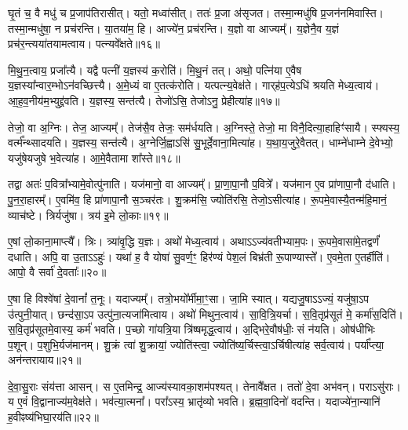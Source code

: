 घृ॒तं च॒ वै मधु॑ च प्र॒जा\-प॑तिरासीत्।
यतो॒ मध्वा॑सीत्।
ततः॑ प्र॒जा अ॑\-सृजत।
तस्मा॒न्मधु॑षि प्र॒जन॑नमिवास्ति।
तस्मा॒न्मधु॑षा॒ न प्रच॑रन्ति।
या॒तया॑म॒ हि।
आज्ये॑न॒ प्रच॑रन्ति।
य॒ज्ञो वा आज्यम्᳚।
य॒ज्ञेनै॒व य॒ज्ञं प्रच॑र॒न्त्यया॑तयामत्वाय।
पत्न्यवे᳚क्षते॥१६॥\ip

मि॒थु॒न॒त्वाय॒ प्रजा᳚त्यै।
यद्वै पत्नी॑ य॒ज्ञस्य॑ क॒रोति॑।
मि॒थु॒नं तत्।
अथो॒ पत्नि॑या ए॒वैष य॒ज्ञस्या᳚न्वार॒म्भो\-ऽन॑वच्छित्त्यै।
अ॒मे॒ध्यं वा ए॒तत्क॑रोति।
यत्पत्न्य॒वेक्ष॑ते।
गार्‌\mbox{}ह॑प॒त्येऽधि॑ श्रयति मेध्य॒त्वाय॑।
आ॒ह॒व॒नीय॑म॒भ्युद्द्र॑वति।
य॒ज्ञस्य॒ सन्त॑त्यै।
तेजो॑ऽसि॒ तेजोऽनु॒ प्रेहीत्या॑ह॥१७॥\ip

तेजो॒ वा अ॒ग्निः।
तेज॒ आज्यम्᳚।
तेज॑सै॒व तेजः॒ सम॑र्धयति।
अ॒ग्निस्ते॒ तेजो॒ मा विनै॒दित्या॒हाहिꣳ॑सायै।
स्फ्यस्य॒ वर्त्म᳚न्थ्सादयति।
य॒ज्ञस्य॒ सन्त॑त्यै।
अ॒ग्नेर्जि॒ह्वाऽसि॑ सु॒भूर्दे॒वाना॒मित्या॑ह।
य॒था॒\-य॒जु\-रे॒वै\-तत्।
धाम्ने॑धाम्ने दे॒वेभ्यो॒ यजु॑षेयजुषे भ॒वेत्या॑ह।
आ॒\-मे॒वैतामा शा᳚स्ते॥१८॥\ip

तद्वा अतः॑ प॒वित्रा᳚भ्यामे॒वोत्पु॑नाति।
यज॑मानो॒ वा आज्यम्᳚।
प्रा॒णा॒पा॒नौ प॒वित्रे᳚।
यज॑मान ए॒व प्रा॑णापा॒नौ द॑धाति।
पु॒न॒रा॒हारम्᳚।
ए॒वमि॑व॒ हि प्रा॑णापा॒नौ स॒ञ्चर॑तः।
शु॒क्रम॑सि॒ ज्योति॑रसि॒ तेजो॒\-ऽसीत्या॑ह।
रू॒पमे॒वास्यै॒तन्म॑हि॒मानं॒ व्याच॑ष्टे।
त्रिर्यजु॑षा।
त्रय॑ इ॒मे लो॒काः॥१९॥\ip

ए॒षां लो॒काना॒माप्त्यै᳚।
त्रिः।
त्र्या॑वृ॒द्धि य॒ज्ञः।
अथो॑ मेध्य॒त्वाय॑।
अथाऽऽज्य॑वतीभ्याम॒पः।
रू॒पमे॒वासा॑मे॒तद्वर्णं॑ दधाति।
अपि॒ वा उ॒ताऽऽहुः॑।
यथा॑ ह॒ वै योषा॑ सु॒वर्ण॒ꣳ॒ हिर॑ण्यं पेश॒लं बिभ्र॑ती रू॒पाण्यास्ते᳚।
ए॒वमे॒ता ए॒तर्\mbox{}हीति॑।
आपो॒ वै सर्वा॑ दे॒वताः᳚॥२०॥\ip

ए॒षा हि विश्वे॑षां दे॒वानां᳚ त॒नूः।
यदाज्यम्᳚।
तत्रो॒भयो᳚र्मीमा॒ꣳ॒सा।
जा॒मि स्यात्।
यद्यजु॒षा\-ऽऽज्यं॒ यजु॑षा॒ऽप उ॑त्पुनी॒यात्।
छन्द॑सा॒ऽप उत्पु॑ना॒त्यजा॑मित्वाय।
अथो॑ मिथुन॒त्वाय॑।
सा॒वि॒त्रि॒यर्चा।
स॒वि॒तृप्र॑सूतं मे॒ कर्मा॑स॒दिति॑।
स॒वि॒तृप्र॑सूतमे॒वास्य॒ कर्म॑ भवति।
प॒च्छो गा॑यत्रि॒या त्रि॑ष्षमृद्ध॒त्वाय॑।
अ॒द्भिरे॒वौष॑धीः॒ सं न॑यति।
ओष॑धीभिः प॒शून्।
प॒शुभि॒र्यज॑मानम्।
शु॒क्रं त्वा॑ शु॒क्रायां॒ ज्योति॑स्त्वा॒ ज्योति॑ष्य॒र्चिस्त्वा॒\-ऽर्चिषीत्या॑ह सर्व॒त्वाय॑।
पर्या᳚प्त्या॒ अन॑न्तरायाय॥२१॥\ip\anuvakamend[ई॒क्ष॒त॒ आ॒ह॒ शा॒स्ते॒ लो॒का दे॒वता॑ भवति॒ षट् च॑]

दे॒वा॒सु॒राः संय॑त्ता आसन्।
स ए॒तमिन्द्र॒ आज्य॑स्याव\-का॒शम॑\-पश्यत्।
तेनावै᳚क्षत।
ततो॑ दे॒वा अभ॑वन्।
पराऽसु॑राः।
य ए॒वं वि॒द्वानाज्य॑म॒वेक्ष॑ते।
भव॑त्या॒त्मना᳚।
परा᳚ऽस्य॒ भ्रातृ॑व्यो भवति।
ब्र॒ह्म॒वा॒दिनो॑ वदन्ति।
यदाज्ये॑ना॒न्यानि॑ ह॒वीꣴष्य॑भिघा॒रय॑ति॥२२॥\ip


